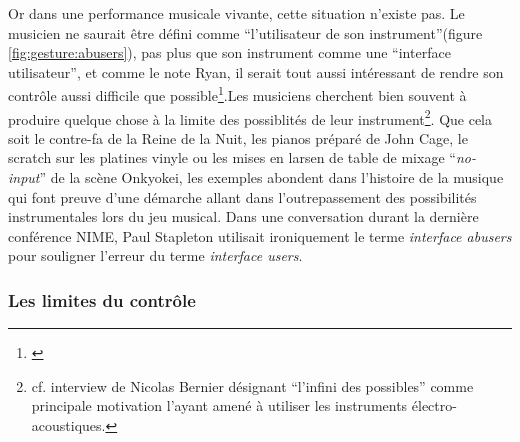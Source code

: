 \indent Or dans une performance musicale vivante, cette situation n'existe pas. Le musicien ne saurait être défini comme ``l'utilisateur de son instrument''(figure \ref{fig:gesture:abusers}), pas plus que son instrument comme une ``interface utilisateur'', et comme le note Ryan, il serait tout aussi intéressant de rendre son contrôle aussi difficile que possible\footnote{ \cite{ryan_remarks_1991}}.Les musiciens cherchent bien souvent à produire quelque chose à la limite des possiblités de leur instrument\footnote{cf. interview de Nicolas Bernier désignant ``l'infini des possibles'' comme principale motivation l'ayant amené à utiliser les instruments électro-acoustiques.}. Que cela soit le contre-fa de la Reine de la Nuit, les pianos préparé de John Cage, le scratch sur les platines vinyle ou les mises en larsen de table de mixage ``\textit{no-input}'' de la scène Onkyokei, les exemples abondent dans l'histoire de la musique qui font preuve d'une démarche allant dans l'outrepassement des possibilités instrumentales lors du jeu musical. Dans une conversation durant la dernière conférence NIME, Paul Stapleton utilisait ironiquement le terme \textit{interface abusers} pour souligner l'erreur du terme \textit{interface users}.

\subsubsection{Les limites du contrôle}

